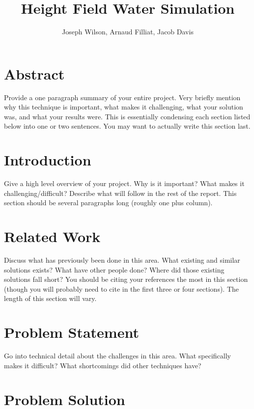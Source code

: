 \documentclass[12pt,titlepage]{article}
\title{Height Field Water Simulation}
\author{Joseph Wilson, Arnaud Filliat, Jacob Davis}
\begin{document}
\maketitle

\section{Abstract}

Provide a one paragraph summary of your entire project. Very briefly mention why this technique is important, what makes it challenging, what your solution was, and what your results were. This is essentially condensing each section listed below into one or two sentences. You may want to actually write this section last.

\section{Introduction}

Give a high level overview of your project. Why is it important? What makes it challenging/difficult? Describe what will follow in the rest of the report. This section should be several paragraphs long (roughly one plus column).

\section{Related Work}

Discuss what has previously been done in this area. What existing and similar solutions exists? What have other people done? Where did those existing solutions fall short? You should be citing your references the most in this section (though you will probably need to cite in the first three or four sections). The length of this section will vary.

\section{Problem Statement}

Go into technical detail about the challenges in this area. What specifically makes it difficult? What shortcomings did other techniques have?

\section{Problem Solution}
\end{document}
